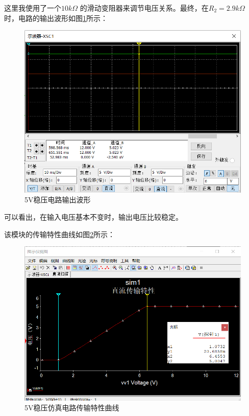 \documentclass{article}
\begin{document}
\begin{spacing}{1.5}
    这里我使用了一个$10 k \Omega $ 的滑动变阻器来调节电压关系。最终，在$R_2 = 2.9 k \Omega $ 
    时，电路的输出波形如图\ref{fig:sim1_result1}所示：

    \begin{figure}[H]
        \centering
        \includegraphics[scale=0.4]{fig/sim/sim1_result1.png}
        \caption{5V稳压电路输出波形}
        \label{fig:sim1_result1}
    \end{figure}
    可以看出，在输入电压基本不变时，输出电压比较稳定。

    该模块的传输特性曲线如图\ref{fig:sim1_result2}所示：
    \begin{figure}[H]
        \centering
        \includegraphics[scale=0.4]{fig/sim/sim1_result2.png}
        \caption{5V稳压仿真电路传输特性曲线}
        \label{fig:sim1_result2}
    \end{figure}
    

\end{spacing}
\end{document}
